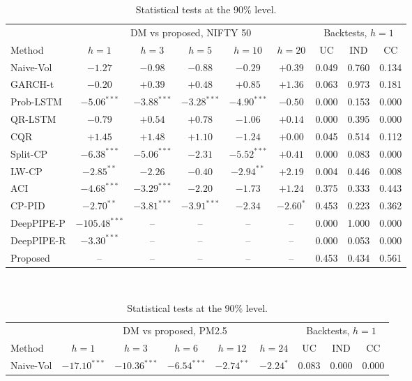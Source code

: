 \begin{table}[!t]\centering\caption{Statistical tests at the 90\% level.}\label{tab:tests}
\scriptsize\setlength{\tabcolsep}{2.6pt}
\begin{tabular}{lcccccccc}\toprule
 & \multicolumn{5}{c}{DM vs proposed, NIFTY 50} & \multicolumn{3}{c}{Backtests, $h=1$}\\
\cmidrule(lr){2-6}\cmidrule(lr){7-9}
Method & $h=1$ & $h=3$ & $h=5$ & $h=10$ & $h=20$ & UC & IND & CC\\\midrule
Naive-Vol & $-1.27$ & $-0.98$ & $-0.88$ & $-0.29$ & $+0.39$ & 0.049 & 0.760 & 0.134\\
GARCH-t & $-0.20$ & $+0.39$ & $+0.48$ & $+0.85$ & $+1.36$ & 0.063 & 0.973 & 0.181\\
Prob-LSTM & $-5.06^{***}$ & $-3.88^{***}$ & $-3.28^{***}$ & $-4.90^{***}$ & $-0.50$ & 0.000 & 0.153 & 0.000\\
QR-LSTM & $-0.79$ & $+0.54$ & $+0.78$ & $-1.06$ & $+0.14$ & 0.000 & 0.395 & 0.000\\
CQR & $+1.45$ & $+1.48$ & $+1.10$ & $-1.24$ & $+0.00$ & 0.045 & 0.514 & 0.112\\
Split-CP & $-6.38^{***}$ & $-5.06^{***}$ & $-2.31$ & $-5.52^{***}$ & $+0.41$ & 0.000 & 0.083 & 0.000\\
LW-CP & $-2.85^{**}$ & $-2.26$ & $-0.40$ & $-2.94^{**}$ & $+2.19$ & 0.004 & 0.446 & 0.008\\
ACI & $-4.68^{***}$ & $-3.29^{***}$ & $-2.20$ & $-1.73$ & $+1.24$ & 0.375 & 0.333 & 0.443\\
CP-PID & $-2.70^{**}$ & $-3.81^{***}$ & $-3.91^{***}$ & $-2.34$ & $-2.60^{*}$ & 0.453 & 0.223 & 0.362\\
DeepPIPE-P & $-105.48^{***}$ & -- & -- & -- & -- & 0.000 & 1.000 & 0.000\\
DeepPIPE-R & $-3.30^{***}$ & -- & -- & -- & -- & 0.000 & 0.053 & 0.000\\
Proposed & -- & -- & -- & -- & -- & 0.453 & 0.434 & 0.561\\
\bottomrule\end{tabular}\\[4pt]
\begin{tabular}{lcccccccc}\toprule
 & \multicolumn{5}{c}{DM vs proposed, PM2.5} & \multicolumn{3}{c}{Backtests, $h=1$}\\
\cmidrule(lr){2-6}\cmidrule(lr){7-9}
Method & $h=1$ & $h=3$ & $h=6$ & $h=12$ & $h=24$ & UC & IND & CC\\\midrule
Naive-Vol & $-17.10^{***}$ & $-10.36^{***}$ & $-6.54^{***}$ & $-2.74^{**}$ & $-2.24^{*}$ & 0.083 & 0.000 & 0.000\\

\end{tabular}
\end{table}
